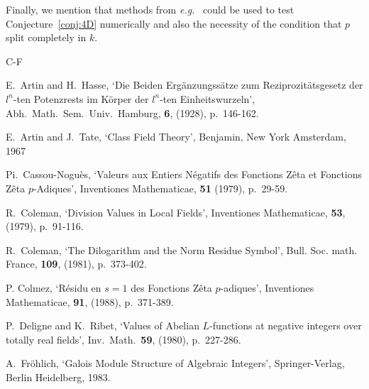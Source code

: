 \documentclass[12pt]{article}
\newcommand{\eg}{\emph{e.g.}}
\begin{document}
Finally, we mention that methods from \eg~\cite{zetap2} could be used to
test Conjecture~\ref{conj:4D} numerically and also
the necessity of the condition that $p$ split completely in $k$.
\begin{thebibliography}{C-F}


E.\ Artin and H.\ Hasse, `Die Beiden Erg\"anzungss\"atze zum Reziprozit\"atsgesetz
der $l^n$-ten Potenzrests im K\"orper der $l^n$-ten Einheitswurzeln',
Abh.\ Math.\ Sem.\ Univ.\ Hamburg, {\bf 6}, (1928),
p.~146-162.

E.\ Artin and J.\ Tate, `Class Field Theory',
Benjamin, New York Amsterdam, 1967



Pi.\ Cassou-Nogu\`{e}s, `Valeurs aux Entiers N\'egatifs des
Fonctions Z\^{e}ta et Fonctions Z\^{e}ta $p$-Adiques',
Inventiones Mathematicae, {\bf 51} (1979), p.~29-59.


R.\ Coleman, `Division Values in Local Fields',
Inventiones Mathematicae, {\bf 53}, (1979),
p.~91-116.

R.\ Coleman, `The Dilogarithm and the Norm Residue Symbol',
Bull. Soc. math. France, {\bf 109}, (1981),
p.~373-402.

P. Colmez, `R\'{e}sidu en $s=1$ des Fonctions Z\^{e}ta
$p$-adiques', Inventiones Mathematicae, {\bf 91}, (1988),
p.~371-389.

P.~Deligne and K.~Ribet, `Values of Abelian $L$-functions at negative integers
over totally real fields', Inv.~Math.~{\bf 59}, (1980), p.~227-286.


A.~Fr\"ohlich, `Galois Module Structure of Algebraic Integers',
Springer-Verlag, Berlin Heidelberg, 1983.





\end{thebibliography}
\end{document}
